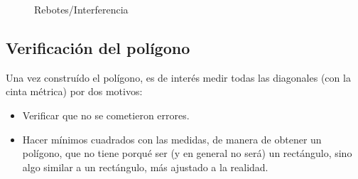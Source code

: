 \documentclass[spanish,12pt,a4paper,titlepage]{report}
\begin{document}
\begin{figure} [h!]
  \centering
  \caption{Rebotes/Interferencia}
  \label{fig:rebotes}
\end{figure}

\newpage
\subsection{Verificación del polígono}
\label{sec:verificacion-del-poligono}

Una vez construído el polígono, es de interés medir todas las diagonales (con la cinta métrica) por dos motivos:
\begin{itemize}
\item Verificar que no se cometieron errores.
\item Hacer mínimos cuadrados con las medidas, de manera de obtener un polígono, que no tiene porqué ser (y en general no será) un rectángulo, sino algo similar a un rectángulo, más ajustado a la realidad.
\end{itemize}
\end{document}

